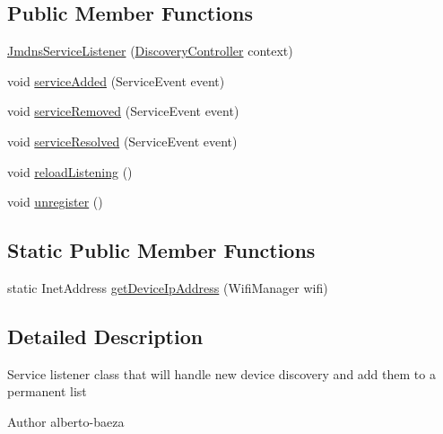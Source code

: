 \subsection*{Public Member Functions}
\begin{DoxyCompactItemize}
\item 
\hyperlink{classandroid_1_1app_1_1printerapp_1_1devices_1_1discovery_1_1_jmdns_service_listener_af72f759b79be25caad9b841dfd391a2a}{Jmdns\+Service\+Listener} (\hyperlink{classandroid_1_1app_1_1printerapp_1_1devices_1_1discovery_1_1_discovery_controller}{Discovery\+Controller} context)
\item 
void \hyperlink{classandroid_1_1app_1_1printerapp_1_1devices_1_1discovery_1_1_jmdns_service_listener_a94976b318c12578fa672e581baaad89f}{service\+Added} (Service\+Event event)
\item 
void \hyperlink{classandroid_1_1app_1_1printerapp_1_1devices_1_1discovery_1_1_jmdns_service_listener_a5aa49de57b702de55e92803c834fe4db}{service\+Removed} (Service\+Event event)
\item 
void \hyperlink{classandroid_1_1app_1_1printerapp_1_1devices_1_1discovery_1_1_jmdns_service_listener_a6087e853e670cc2fc88592bb522ee23c}{service\+Resolved} (Service\+Event event)
\item 
void \hyperlink{classandroid_1_1app_1_1printerapp_1_1devices_1_1discovery_1_1_jmdns_service_listener_aa128ec7675982afa90ee136a8ec3c637}{reload\+Listening} ()
\item 
void \hyperlink{classandroid_1_1app_1_1printerapp_1_1devices_1_1discovery_1_1_jmdns_service_listener_a01173a6f2835409e9fec19de5b20bd1a}{unregister} ()
\end{DoxyCompactItemize}
\subsection*{Static Public Member Functions}
\begin{DoxyCompactItemize}
\item 
static Inet\+Address \hyperlink{classandroid_1_1app_1_1printerapp_1_1devices_1_1discovery_1_1_jmdns_service_listener_a1d8916b375e3a55e639feabfb9f5c1ab}{get\+Device\+Ip\+Address} (Wifi\+Manager wifi)
\end{DoxyCompactItemize}


\subsection{Detailed Description}
Service listener class that will handle new device discovery and add them to a permanent list \begin{DoxyAuthor}{Author}
alberto-\/baeza 
\end{DoxyAuthor}


